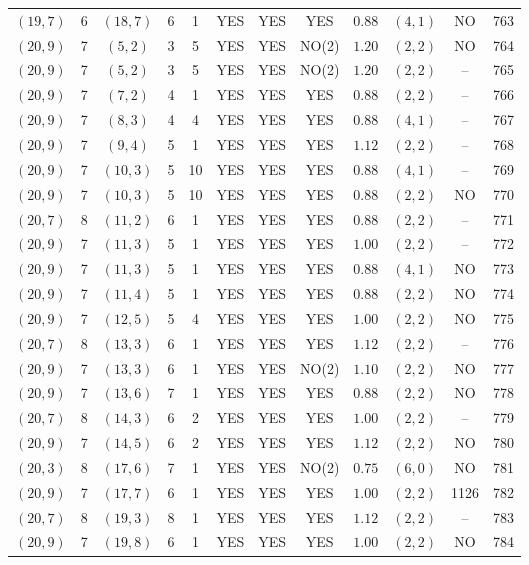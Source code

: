 \begin{longtable}{|c|c|c|c|c|c|c|c|c|c|c|c|}
$(19,7)$ & 6 & $(18,7)$ & 6 & 1 & YES & YES & YES & $0.88$ & $(4,1)$ & NO & 763\\
$(20,9)$ & 7 & $(5,2)$ & 3 & 5 & YES & YES & NO(2) & $1.20$ & $(2,2)$ & NO & 764\\
$(20,9)$ & 7 & $(5,2)$ & 3 & 5 & YES & YES & NO(2) & $1.20$ & $(2,2)$ & -- & 765\\
$(20,9)$ & 7 & $(7,2)$ & 4 & 1 & YES & YES & YES & $0.88$ & $(2,2)$ & -- & 766\\
$(20,9)$ & 7 & $(8,3)$ & 4 & 4 & YES & YES & YES & $0.88$ & $(4,1)$ & -- & 767\\
$(20,9)$ & 7 & $(9,4)$ & 5 & 1 & YES & YES & YES & $1.12$ & $(2,2)$ & -- & 768\\
$(20,9)$ & 7 & $(10,3)$ & 5 & 10 & YES & YES & YES & $0.88$ & $(4,1)$ & -- & 769\\
$(20,9)$ & 7 & $(10,3)$ & 5 & 10 & YES & YES & YES & $0.88$ & $(2,2)$ & NO & 770\\
$(20,7)$ & 8 & $(11,2)$ & 6 & 1 & YES & YES & YES & $0.88$ & $(2,2)$ & -- & 771\\
$(20,9)$ & 7 & $(11,3)$ & 5 & 1 & YES & YES & YES & $1.00$ & $(2,2)$ & -- & 772\\
$(20,9)$ & 7 & $(11,3)$ & 5 & 1 & YES & YES & YES & $0.88$ & $(4,1)$ & NO & 773\\
$(20,9)$ & 7 & $(11,4)$ & 5 & 1 & YES & YES & YES & $0.88$ & $(2,2)$ & NO & 774\\
$(20,9)$ & 7 & $(12,5)$ & 5 & 4 & YES & YES & YES & $1.00$ & $(2,2)$ & NO & 775\\
$(20,7)$ & 8 & $(13,3)$ & 6 & 1 & YES & YES & YES & $1.12$ & $(2,2)$ & -- & 776\\
$(20,9)$ & 7 & $(13,3)$ & 6 & 1 & YES & YES & NO(2) & $1.10$ & $(2,2)$ & NO & 777\\
$(20,9)$ & 7 & $(13,6)$ & 7 & 1 & YES & YES & YES & $0.88$ & $(2,2)$ & NO & 778\\
$(20,7)$ & 8 & $(14,3)$ & 6 & 2 & YES & YES & YES & $1.00$ & $(2,2)$ & -- & 779\\
$(20,9)$ & 7 & $(14,5)$ & 6 & 2 & YES & YES & YES & $1.12$ & $(2,2)$ & NO & 780\\
$(20,3)$ & 8 & $(17,6)$ & 7 & 1 & YES & YES & NO(2) & $0.75$ & $(6,0)$ & NO & 781\\
$(20,9)$ & 7 & $(17,7)$ & 6 & 1 & YES & YES & YES & $1.00$ & $(2,2)$ & 1126 & 782\\
$(20,7)$ & 8 & $(19,3)$ & 8 & 1 & YES & YES & YES & $1.12$ & $(2,2)$ & -- & 783\\
$(20,9)$ & 7 & $(19,8)$ & 6 & 1 & YES & YES & YES & $1.00$ & $(2,2)$ & NO & 784\\

\end{longtable}
